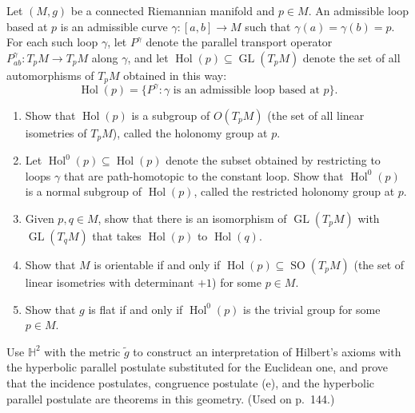 \begin{exercise}
\label{prob:holonomy-group}

Let $(M,g)$ be a connected Riemannian manifold and $p \in M$. An admissible loop based at $p$ is an admissible curve $\gamma: [a,b] \to M$ such that $\gamma(a) = \gamma(b) = p$. For each such loop $\gamma$, let $P^\gamma$ denote the parallel transport operator $P^\gamma_{ab}: T_pM \to T_pM$ along $\gamma$, and let $\operatorname{Hol}(p) \subseteq \operatorname{GL}(T_pM)$ denote the set of all automorphisms of $T_pM$ obtained in this way:
\[
\operatorname{Hol}(p) = \{P^\gamma : \gamma \text{ is an admissible loop based at } p\}.
\]
\begin{enumerate}
\item[(a)] Show that $\operatorname{Hol}(p)$ is a subgroup of $O(T_pM)$ (the set of all linear isometries of $T_pM$), called the holonomy group at $p$.
\item[(b)] Let $\operatorname{Hol}^0(p) \subseteq \operatorname{Hol}(p)$ denote the subset obtained by restricting to loops $\gamma$ that are path-homotopic to the constant loop. Show that $\operatorname{Hol}^0(p)$ is a normal subgroup of $\operatorname{Hol}(p)$, called the restricted holonomy group at $p$.
\item[(c)] Given $p,q \in M$, show that there is an isomorphism of $\operatorname{GL}(T_pM)$ with $\operatorname{GL}(T_qM)$ that takes $\operatorname{Hol}(p)$ to $\operatorname{Hol}(q)$.
\item[(d)] Show that $M$ is orientable if and only if $\operatorname{Hol}(p) \subseteq \operatorname{SO}(T_pM)$ (the set of linear isometries with determinant $+1$) for some $p \in M$.
\item[(e)] Show that $g$ is flat if and only if $\operatorname{Hol}^0(p)$ is the trivial group for some $p \in M$.
\end{enumerate}
\end{exercise}

\begin{exercise}
\label{prob:hyperbolic-geometry-hilbert-axioms}

Use $\mathbb{H}^2$ with the metric $\tilde{g}$ to construct an interpretation of Hilbert's axioms with the hyperbolic parallel postulate substituted for the Euclidean one, and prove that the incidence postulates, congruence postulate (e), and the hyperbolic parallel postulate are theorems in this geometry. (Used on p.\ 144.)
\end{exercise}

